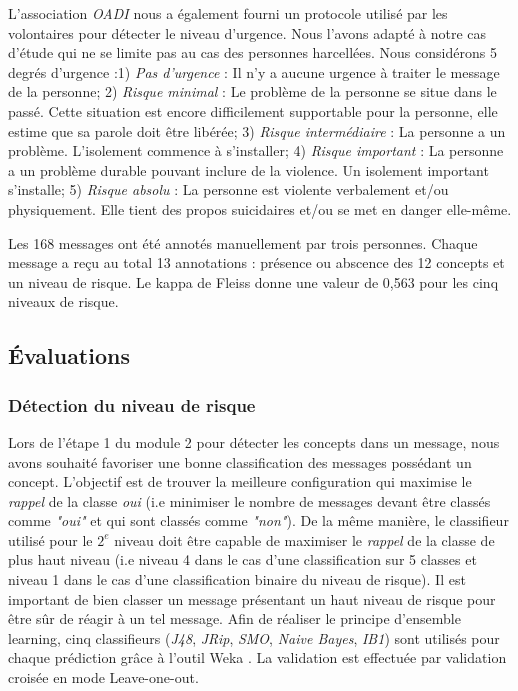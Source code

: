 L'association \emph{OADI} %
nous a également fourni un protocole utilisé par les volontaires pour détecter le niveau d'urgence. Nous l'avons adapté à notre cas d'étude qui ne se limite pas au cas des personnes harcellées. Nous considérons 5 degrés d'urgence :1) \emph{Pas d'urgence} : Il n'y a aucune urgence à traiter le message de la personne;
2) \emph{Risque minimal} : Le problème de la personne se situe dans le passé. Cette situation  est encore difficilement supportable pour la personne, elle estime que sa parole doit être libérée;
3) \emph{Risque intermédiaire} : La personne a un problème. L'isolement commence à s'installer;
4) \emph{Risque important} :  La personne a un problème durable pouvant inclure de la violence. Un isolement important s'installe;
5) \emph{Risque absolu} : La personne est violente verbalement et/ou physiquement. Elle tient des propos suicidaires et/ou se met en danger elle-même.

Les 168 messages ont été annotés manuellement par trois personnes. Chaque message a reçu au total 13 annotations : présence ou abscence des 12 concepts et un niveau de risque. Le kappa de Fleiss donne une valeur de 0,563 pour les cinq niveaux de risque.

\subsection{Évaluations}
\subsubsection{Détection du niveau de risque}
Lors de l'étape 1 du module 2 pour détecter les concepts dans un message, nous avons souhaité favoriser une bonne classification des messages possédant un concept. %
L'objectif est de trouver la meilleure configuration qui maximise le \emph{rappel} de la classe \emph{oui} (i.e minimiser le nombre de messages devant être classés comme \emph{"oui"} et qui sont classés comme \emph{"non"}). De la même manière, le classifieur utilisé pour le $2^e$ niveau doit être capable de maximiser le \emph{rappel} de la classe de plus haut niveau (i.e niveau 4 dans le cas d'une classification sur 5 classes et niveau 1 dans le cas d'une classification binaire du niveau de risque). Il est important de bien classer un message présentant un haut niveau de risque pour être sûr de réagir à un tel message. Afin de réaliser le principe d'ensemble learning, cinq classifieurs  (\emph{J48}, \emph{JRip}, \emph{SMO}, \emph{Naive Bayes}, \emph{IB1}) sont utilisés pour chaque prédiction grâce à l'outil Weka \cite{hall2009weka}. La validation est effectuée par validation croisée en mode Leave-one-out.

